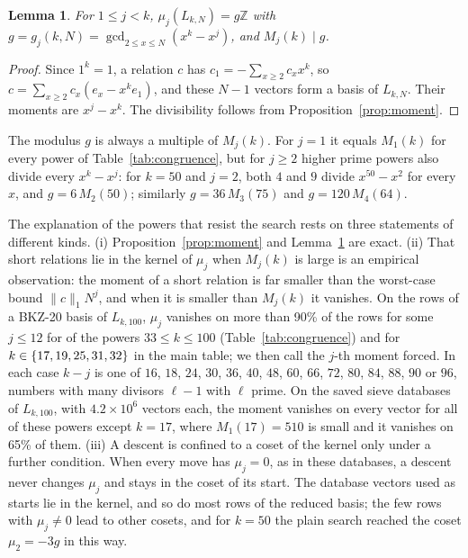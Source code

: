 \documentclass[11pt]{amsart}
\newtheorem{lemma}[proposition]{Lemma}
\theoremstyle{definition}
\theoremstyle{remark}
\newcommand{\Z}{\mathbb{Z}}
\begin{document}
\begin{lemma}\label{lem:image}
For $1\le j<k$, $\mu_j(L_{k,N})=g\Z$ with $g=g_j(k,N)=\gcd_{2\le x\le N}(x^k-x^j)$, and
$M_j(k)\mid g$.
\end{lemma}

\begin{proof}
Since $1^k=1$, a relation $c$ has $c_1=-\sum_{x\ge2}c_xx^k$, so $c=\sum_{x\ge2}c_x(e_x-x^ke_1)$,
and these $N-1$ vectors form a basis of $L_{k,N}$. Their moments are $x^j-x^k$. The divisibility
follows from Proposition~\ref{prop:moment}.
\end{proof}

The modulus $g$ is always a multiple of $M_j(k)$. For $j=1$ it equals $M_1(k)$ for every power
of Table~\ref{tab:congruence}, but for $j\ge2$ higher prime powers also divide every
$x^k-x^j$: for $k=50$ and $j=2$, both $4$ and $9$ divide $x^{50}-x^2$ for every $x$, and
$g=6\,M_2(50)$; similarly $g=36\,M_3(75)$ and $g=120\,M_4(64)$.

The explanation of the powers that resist the search rests on three statements of different
kinds. (i) Proposition~\ref{prop:moment} and Lemma~\ref{lem:image} are exact. (ii) That short
relations lie in the kernel of $\mu_j$ when $M_j(k)$ is large is an empirical observation: the moment of a short relation is far smaller than the
worst-case bound $\|c\|_1N^j$, and when it is smaller than $M_j(k)$ it vanishes. On the rows of a
BKZ-20 basis of $L_{k,100}$, $\mu_j$ vanishes on more than 90\% of the rows for some $j\le12$ for
\ForcedK{} of the powers $33\le k\le100$ (Table~\ref{tab:congruence}) and for
$k\in\{17, 19, 25, 31, 32\}$ in the main table; we then call the $j$-th moment forced. In each case $k-j$ is one of $16$, $18$, $24$, $30$, $36$, $40$,
$48$, $60$, $66$, $72$, $80$, $84$, $88$, $90$ or $96$, numbers with many divisors $\ell-1$
with $\ell$ prime. On the saved sieve databases of $L_{k,100}$, with $4.2\times10^6$ vectors each, the moment
vanishes on every vector for all of these powers except $k=17$, where $M_1(17)=510$ is small and
it vanishes on 65\% of them. (iii) A descent is confined to a coset of the kernel only under a
further condition. When every move has $\mu_j=0$, as in these databases, a descent never changes
$\mu_j$ and stays in the coset of its start. The database vectors used as starts lie in the
kernel, and so do most rows of the reduced basis; the few rows with $\mu_j\ne0$ lead to other
cosets, and for $k=50$ the plain search reached the coset $\mu_2=-3g$ in this way.
\end{document}
